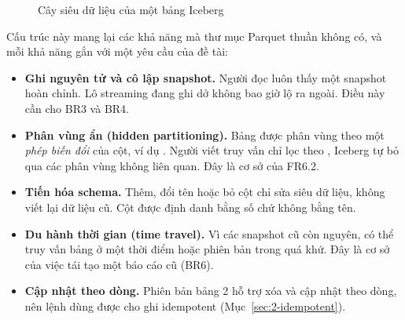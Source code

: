 \begin{figure}[H]
\centering
{}
\caption{Cây siêu dữ liệu của một bảng Iceberg}
\label{fig:2-iceberg-tree}
\end{figure}

Cấu trúc này mang lại các khả năng mà thư mục Parquet thuần không có, và mỗi khả năng gắn với một yêu cầu của đề tài:

\begin{itemize}
  \item \textbf{Ghi nguyên tử và cô lập snapshot.} Người đọc luôn thấy một snapshot hoàn chỉnh. Lô streaming đang ghi dở không bao giờ lộ ra ngoài. Điều này cần cho BR3 và BR4.
  \item \textbf{Phân vùng ẩn (hidden partitioning).} Bảng được phân vùng theo một \emph{phép biến đổi} của cột, ví dụ . Người viết truy vấn chỉ lọc theo , Iceberg tự bỏ qua các phân vùng không liên quan. Đây là cơ sở của FR6.2.
  \item \textbf{Tiến hóa schema.} Thêm, đổi tên hoặc bỏ cột chỉ sửa siêu dữ liệu, không viết lại dữ liệu cũ. Cột được định danh bằng số chứ không bằng tên.
  \item \textbf{Du hành thời gian (time travel).} Vì các snapshot cũ còn nguyên, có thể truy vấn bảng ở một thời điểm hoặc phiên bản trong quá khứ. Đây là cơ sở của việc tái tạo một báo cáo cũ (BR6).
  \item \textbf{Cập nhật theo dòng.} Phiên bản bảng 2 hỗ trợ xóa và cập nhật theo dòng, nên lệnh  dùng được cho ghi idempotent (Mục~\ref{sec:2-idempotent}).
\end{itemize}

